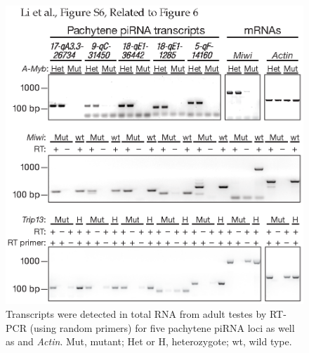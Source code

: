    \begin{figure} %
      \centering 
      \includegraphics{Figures/MolCel/MolCel2013_FigS6.eps}
      \caption[Pachytene piRNA Precursor Abundance in \amyb{}, \miwi{}, and \textit{Trip13} Mutants]
      {
      Transcripts were detected in total RNA from adult testes by RT-PCR (using random primers) for five pachytene piRNA loci as well as \miwi{} and \textit{Actin}. Mut, mutant; Het or H, heterozygote; wt, wild type.
      }
      \label{MolCel:fig:MolCelS6}
   	  \end{figure}

